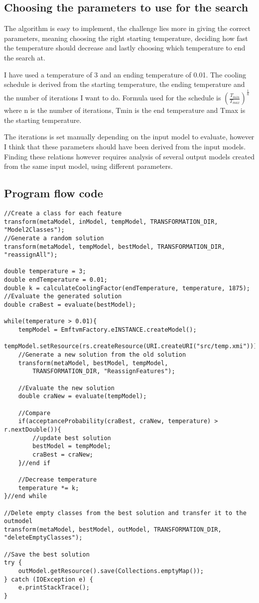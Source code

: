 \documentclass[a4paper]{article}
\begin{document}
\subsection{Choosing the parameters to use for the search}

The algorithm is easy to implement, the challenge lies more in giving the correct parameters, meaning choosing the right starting temperature, deciding how fast the temperature should decrease and lastly choosing which temperature to end the search at.

I have used a temperature of 3 and an ending temperature of 0.01.
The cooling schedule is derived from the starting temperature, the ending temperature and the number of iterations I want to do.
Formula used for the schedule is $(\frac{T_{min}}{T_{max}})^\frac{1}{n}$ where n is the number of iterations, Tmin is the end temperature and Tmax is the starting temperature.

The iterations is set manually depending on the input model to evaluate, however I think that these parameters should have been derived from the input models.
Finding these relations however requires analysis of several output models created from the same input model, using different parameters.


\subsection{Program flow code}

\begin{lstlisting}
//Create a class for each feature
transform(metaModel, inModel, tempModel, TRANSFORMATION_DIR, "Model2Classes");
//Generate a random solution
transform(metaModel, tempModel, bestModel, TRANSFORMATION_DIR, "reassignAll");

double temperature = 3;
double endTemperature = 0.01;
double k = calculateCoolingFactor(endTemperature, temperature, 1875);
//Evaluate the generated solution
double craBest = evaluate(bestModel);

while(temperature > 0.01){
	tempModel = EmftvmFactory.eINSTANCE.createModel();
	tempModel.setResource(rs.createResource(URI.createURI("src/temp.xmi")));
	//Generate a new solution from the old solution
	transform(metaModel, bestModel, tempModel,
		TRANSFORMATION_DIR, "ReassignFeatures");

	//Evaluate the new solution
	double craNew = evaluate(tempModel);

	//Compare
	if(acceptanceProbability(craBest, craNew, temperature) > r.nextDouble()){
		//update best solution
		bestModel = tempModel;
		craBest = craNew;
	}//end if

	//Decrease temperature
	temperature *= k;
}//end while

//Delete empty classes from the best solution and transfer it to the outmodel
transform(metaModel, bestModel, outModel, TRANSFORMATION_DIR,
"deleteEmptyClasses");

//Save the best solution
try {
	outModel.getResource().save(Collections.emptyMap());
} catch (IOException e) {
	e.printStackTrace();
}
\end{lstlisting}
\end{document}
